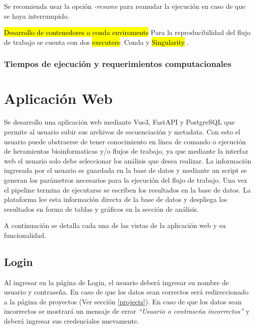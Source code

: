 Se recomienda usar la opción \textit{-resume} para reanudar la ejecución en caso de que se haya interrumpido.

\hl{Desarrollo de contenedores o conda enviroments}
Para la reproducibilidad del flujo de trabajo se cuenta con dos \hl{executers}: Conda y \hl{Singularity}    .

\subsubsection{Tiempos de ejecución y requerimientos computacionales}

\newpage
\section{Aplicación Web}
Se desarrollo una aplicación web mediante Vue3, FastAPI y PostgreSQL que permite al usuario subir sus archivos de secuenciación y metadata. 
Con esto el usuario puede abstraerse de tener conocimiento en línea de comando o ejecución de heramientas bioinformaticas y/o flujos de trabajo, 
ya que mediante la interfaz web el usuario solo debe seleccionar los análisis que desea realizar.
La información ingresada por el usuario es guardada en la base de datos y mediante un script se generan los parámetros necesarios para la ejecución del flujo de trabajo.
Una vez el pipeline termina de ejecutarse se escriben los resultados en la base de datos. 
La plataforma lee esta información directa de la base de datos y despliega los resultados en forma de tablas y gráficos en la sección de análisis.


A continuación se detalla cada una de las vistas de la aplicación web y su funcionalidad.

\subsection{Login}
Al ingresar en la página de Login, el usuario deberá ingresar su nombre de usuario y contraseña.
En caso de que los datos sean correctos será redireccionado a la página de proyectos (Ver sección \ref{projects}).
En caso de que los datos sean incorrectos se mostrará un mensaje de error \textit{“Usuario o contraseña incorrectos”} y deberá ingresar sus credenciales nuevamente.


